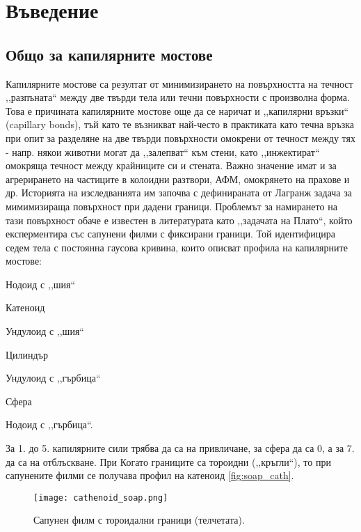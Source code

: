 \section{Въведение}
\subsection{Общо за капилярните мостове}
Капилярните мостове са резултат от минимизирането на повърхността на течност
,,разпъната`` между две твърди тела или течни повърхности с произволна форма.
Това е причината капилярните мостове още да се наричат и ,,капилярни връзки`` (capillary bonds),
тъй като те възникват най-често в практиката като течна връзка при опит за разделяне на две
твърди повърхности омокрени от течност между тях - напр. някои животни могат да ,,залепват`` към
стени, като ,,инжектират`` омокряща течност между \cite{Persson_2007} крайниците си и стената.
Важно значение имат и за агрерирането на частиците в колоидни разтвори, АФМ, омокрянето на прахове и др.
Историята на изследванията им започва с дефинираната от Лагранж задача за мимимизираща повърхност
при дадени граници. Проблемът за намирането на тази повърхност обаче е известен в литературата
като ,,задачата на Плато``, който експерментира със сапунени филми с фиксирани граници.
Той идентифицира седем тела с постоянна гаусова кривина, които описват профила на капилярните мостове:
\begin{enumerate*}
	\item Нодоид с ,,шия``
	\item Катеноид
	\item Ундулоид с ,,шия``
	\item Цилиндър
	\item Ундулоид с ,,гърбица``
	\item Сфера
	\item Нодоид с ,,гърбица``.
\end{enumerate*}
За 1. до 5. капилярните сили трябва да са на привличане, за сфера да са 0, а за 7. да са на
отблъскване. При \cite{Kralchevsky}
Когато границите са тороидни (,,кръгли``), то при сапунените филми се получава профил на катеноид \autoref{fig:soap_cath}.
\begin{figure}[h]
	\centering
	\texttt{[image: cathenoid\_soap.png]}
	\caption{Сапунен филм с тороидални граници (телчетата).\cite{Soap_cathenoid}}
	\label{fig:soap_cath}
\end{figure}
